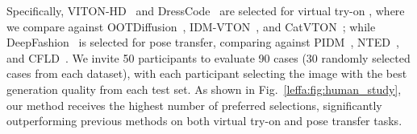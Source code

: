 Specifically, VITON-HD~\citep{choi2021viton} and DressCode~\citep{morelli2022dress} are selected for virtual try-on , where we compare against OOTDiffusion~\citep{xu2024ootdiffusion}, IDM-VTON~\citep{choi2024improving}, and CatVTON~\citep{chong2024catvton}; while DeepFashion~\citep{liu2016deepfashion} is selected for pose transfer, comparing against PIDM~\citep{bhunia2023person}, NTED~\citep{ren2022neural}, and CFLD~\citep{lu2024coarse}.
We invite 50 participants to evaluate 90 cases (30 randomly selected cases from each dataset), with each participant selecting the image with the best generation quality from each test set.
As shown in Fig.~\ref{leffa:fig:human_study}, our method receives the highest number of preferred selections, significantly outperforming previous methods on both virtual try-on and pose transfer tasks.
